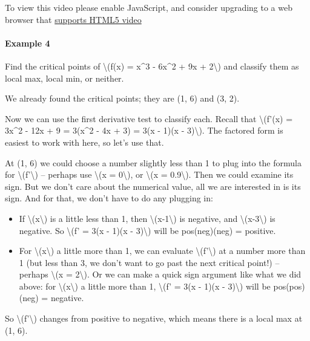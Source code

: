 To view this video please enable JavaScript, and consider upgrading to a
web browser that \href{http://videojs.com/html5-video-support/}{supports
HTML5 video}

\hypertarget{example-4}{%
\paragraph{Example 4}\label{example-4}}

Find the critical points of \textbackslash{}(f(x) = x\^{}3 - 6x\^{}2 +
9x + 2\textbackslash{}) and classify them as local max, local min, or
neither.

We already found the critical points; they are (1, 6) and (3, 2).

Now we can use the first derivative test to classify each. Recall that
\textbackslash{}(f'(x) = 3x\^{}2 - 12x + 9 = 3(x\^{}2 - 4x + 3) = 3(x -
1)(x - 3)\textbackslash{}). The factored form is easiest to work with
here, so let's use that.

At (1, 6) we could choose a number slightly less than 1 to plug into the
formula for \textbackslash{}(f'\textbackslash{}) -- perhaps use
\textbackslash{}(x = 0\textbackslash{}), or \textbackslash{}(x =
0.9\textbackslash{}). Then we could examine its sign. But we don't care
about the numerical value, all we are interested in is its sign. And for
that, we don't have to do any plugging in:

\begin{itemize}
\tightlist
\item
  If \textbackslash{}(x\textbackslash{}) is a little less than 1, then
  \textbackslash{}(x-1\textbackslash{}) is negative, and
  \textbackslash{}(x-3\textbackslash{}) is negative. So
  \textbackslash{}(f' = 3(x - 1)(x - 3)\textbackslash{}) will be
  pos(neg)(neg) = positive.
\item
  For \textbackslash{}(x\textbackslash{}) a little more than 1, we can
  evaluate \textbackslash{}(f'\textbackslash{}) at a number more than 1
  (but less than 3, we don't want to go past the next critical point!)
  -- perhaps \textbackslash{}(x = 2\textbackslash{}). Or we can make a
  quick sign argument like what we did above: for
  \textbackslash{}(x\textbackslash{}) a little more than 1,
  \textbackslash{}(f' = 3(x - 1)(x - 3)\textbackslash{}) will be
  pos(pos)(neg) = negative.
\end{itemize}

So \textbackslash{}(f'\textbackslash{}) changes from positive to
negative, which means there is a local max at (1, 6).

